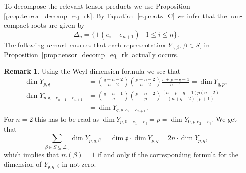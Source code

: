\documentclass[JEP,XML,SOM,NoFloatCountersInSection,Unicode,published]{cedram}
\theoremstyle{definition}
\newtheorem{remark}[theorem]{Remark}
\newcommand{\mf}[1]{\ensuremath{\mathfrak{#1}}}
\begin{document}
To decompose the relevant tensor products we use Proposition \ref{prop:tensor_decomp_eq_rk}. By Equation~\eqref{eq:roots_C} we infer that the non-compact roots are given by
\[
\Delta_n=\{\pm(e_i-e_{n+1})\mid1\leq i\leq n\}.
\]
The following remark ensures that each representation $Y_{\tau,\beta}$, $\beta\in S$, in Proposition~\ref{prop:tensor_decomp_eq_rk} actually occurs.
\begin{remark}\label{rem:dim_C}
Using the Weyl dimension formula we see that
\begin{align*}
\dim Y_{p,q}&=\binom{q+n-2}{n-2}\binom{p+n-2}{n-2}\frac{n+p+q-1}{n-1}=\dim Y_{q,p},\\
\dim Y_{p,q,-e_{n-1}+e_{n+1}}&=\binom{q+n-1}{q}\binom{p+n-2}{p}\frac{(n+p+q-1)p(n-2)}{(n+q-2)(p+1)}\\
&=\dim Y_{q,p,e_2-e_{n+1}}.
\end{align*}
For $n=2$ this has to be read as $\dim Y_{p,0,-e_1+e_3}=p=\dim Y_{0,p,e_2-e_{3}}$. We get that
\[
\sum_{\beta\in S\subseteq\Delta_n}\dim Y_{p,q,\beta}=\dim\mf p\cdot\dim Y_{p,q}=2n\cdot\dim Y_{p,q},
\]
which implies that $m(\beta)=1$ if and only if the corresponding formula for the dimension of $Y_{p,q,\beta}$ in not zero.
\end{remark}
\end{document}
